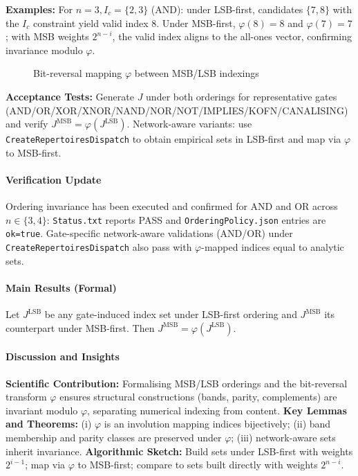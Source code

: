 \textbf{Examples:} For \(n=3, I_c=\{2,3\}\) (AND): under LSB-first, candidates \(\{7,8\}\) with the \(I_c\) constraint yield valid index \(8\). Under MSB-first, \(\varphi(8)=8\) and \(\varphi(7)=7\); with MSB weights \(2^{n-i}\), the valid index aligns to the all-ones vector, confirming invariance modulo \(\varphi\).
\begin{figure}[h]
\centering
{}
\caption{Bit-reversal mapping \(\varphi\) between MSB/LSB indexings}
\end{figure}
\textbf{Acceptance Tests:} Generate \(J\) under both orderings for representative gates (AND/OR/XOR/XNOR/NAND/NOR/NOT/IMPLIES/KOFN/CANALISING) and verify \(J^{\mathrm{MSB}}=\varphi(J^{\mathrm{LSB}})\). Network-aware variants: use \texttt{CreateRepertoiresDispatch} to obtain empirical sets in LSB-first and map via \(\varphi\) to MSB-first.

\paragraph{Verification Update} Ordering invariance has been executed and confirmed for AND and OR across \(n\in\{3,4\}\): \texttt{Status.txt} reports PASS and \texttt{OrderingPolicy.json} entries are \texttt{ok=true}. Gate-specific network-aware validations (AND/OR) under \texttt{CreateRepertoiresDispatch} also pass with \(\varphi\)-mapped indices equal to analytic sets.
\paragraph{Main Results (Formal)}
\begin{theorem}
Let \(J^{\mathrm{LSB}}\) be any gate-induced index set under LSB-first ordering and \(J^{\mathrm{MSB}}\) its counterpart under MSB-first. Then \(J^{\mathrm{MSB}}=\varphi(J^{\mathrm{LSB}})\).
\end{theorem}
\paragraph{Discussion and Insights}
\textbf{Scientific Contribution:} Formalising MSB/LSB orderings and the bit-reversal transform \(\varphi\) ensures structural constructions (bands, parity, complements) are invariant modulo \(\varphi\), separating numerical indexing from content.
\textbf{Key Lemmas and Theorems:} (i) \(\varphi\) is an involution mapping indices bijectively; (ii) band membership and parity classes are preserved under \(\varphi\); (iii) network-aware sets inherit invariance.
\textbf{Algorithmic Sketch:} Build sets under LSB-first with weights \(2^{i-1}\); map via \(\varphi\) to MSB-first; compare to sets built directly with weights \(2^{n-i}\).

